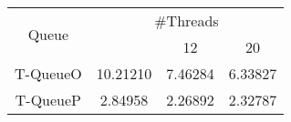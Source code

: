 \begin{tabular}{|c|c|c|c|}
\hline
\multirow{2}{*}{Queue} & \multicolumn{3}{c|}{\#Threads}\\\cline{2-4}& \quad 4 & 12 & 20\\
\hline
\hline
T-QueueO & 10.21210 & 7.46284 & 6.33827\\
T-QueueP & 2.84958 & 2.26892 & 2.32787\\
\hline\end{tabular}
